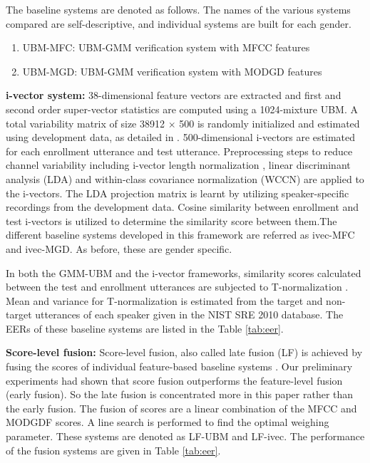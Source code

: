 \documentclass[preprint,12pt,5p]{elsarticle}
\begin{document}
The baseline systems are denoted as follows. The names of the various systems
compared are self-descriptive, and individual systems are built for each gender.
\begin{enumerate}
\item UBM-MFC: UBM-GMM verification system with MFCC features
\item UBM-MGD: UBM-GMM verification system with MODGD features
\end{enumerate}

\textbf{i-vector system:} 
38-dimensional feature vectors are extracted and first and second order
super-vector statistics are computed using a 1024-mixture UBM. A total
variability matrix of size 38912 $\times$ 500 is randomly initialized and
estimated using development data, as detailed in \cite{dehak_ivector,
kenny_JFA}.  500-dimensional i-vectors are estimated for each enrollment
utterance and test utterance. Preprocessing steps to reduce channel variability
including i-vector length normalization \cite{garciaRomero}, linear discriminant
analysis (LDA) and within-class covariance normalization (WCCN) are applied to
the i-vectors.  The LDA projection matrix is learnt by utilizing
speaker-specific recordings from the development data. %
Cosine similarity between enrollment and test i-vectors is utilized to determine
the similarity score between them.The different baseline systems developed in
this framework are referred as ivec-MFC and ivec-MGD. As before, these are
gender specific.

In both the GMM-UBM and the i-vector frameworks, similarity
scores calculated between the test and enrollment utterances 
are subjected to T-normalization \cite{tnorm}. Mean and variance for T-normalization is
estimated from the target and non-target utterances of each speaker given in the 
NIST SRE 2010 database. The EERs of these baseline systems are listed in the Table \ref{tab:eer}.

\textbf{Score-level fusion:}  Score-level fusion, also called late fusion (LF)
is achieved by fusing the scores of individual feature-based baseline systems
\cite{fusion}. Our preliminary experiments had shown that score fusion outperforms 
the feature-level fusion (early fusion). So the late fusion is concentrated more in this paper 
rather than the early fusion. The fusion of scores are a linear 
combination of the MFCC and MODGDF scores. A line search is performed 
to find the optimal weighing parameter. These systems are denoted as LF-UBM 
and LF-ivec.  The performance of the fusion systems are given in Table \ref{tab:eer}. 
	
\end{document}
